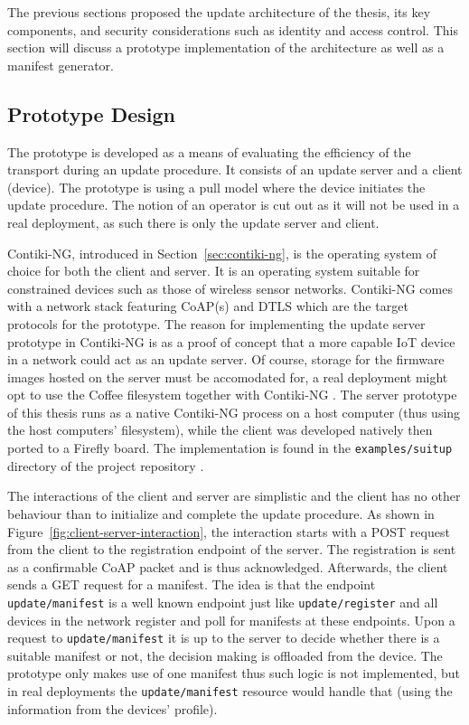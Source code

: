 \documentclass[0-thesis.tex]{subfiles}
\begin{document}
The previous sections proposed the update architecture of the thesis, its key components,
and security considerations such as identity and access control. This section will discuss
a prototype implementation of the architecture as well as a manifest generator. 

\subsection{Prototype Design}
\label{ssec:prototype-design}
The prototype is developed as a means of evaluating the efficiency of the transport during
an update procedure. It consists of an update server and a client (device). The prototype
is using a pull model where the device initiates the update procedure. The notion of an
operator is cut out as it will not be used in a real deployment, as such there is only the
update server and client.

Contiki-NG, introduced in Section~\ref{sec:contiki-ng}, is the operating system of choice
for both the client and server. It is an operating system suitable for constrained devices
such as those of wireless sensor networks. Contiki-NG comes with a network stack featuring
CoAP(s) and DTLS which are the target protocols for the prototype. The reason for
implementing the update server prototype in Contiki-NG is as a proof of concept that a
more capable IoT device in a network could act as an update server. Of course, storage for
the firmware images hosted on the server must be accomodated for, a real deployment might
opt to use the Coffee filesystem together with Contiki-NG \parencite{coffee}. The server
prototype of this thesis runs as a native Contiki-NG process on a host computer (thus
using the host computers' filesystem), while the client was developed natively then ported
to a Firefly board. The implementation is found in the \texttt{examples/suitup} directory
of the project repository \parencite{suitup}. %

The interactions of the client and server are simplistic and the client has no other
behaviour than to initialize and complete the update procedure. As shown in
Figure~\ref{fig:client-server-interaction}, the interaction starts with a POST request
from the client to the registration endpoint of the server. The registration is sent as a
confirmable CoAP packet and is thus acknowledged. Afterwards, the client sends a GET
request for a manifest. The idea is that the endpoint \texttt{update/manifest} is a well
known endpoint just like \texttt{update/register} and all devices in the network register
and poll for manifests at these endpoints. Upon a request to \texttt{update/manifest} it
is up to the server to decide whether there is a suitable manifest or not, the decision
making is offloaded from the device. The prototype only makes use of one manifest thus
such logic is not implemented, but in real deployments the \texttt{update/manifest}
resource would handle that (using the information from the devices' profile).
\end{document}
